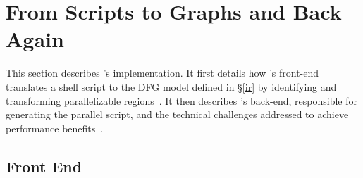 \documentclass[letterpaper,twocolumn,10pt]{article}
\newcommand{\kk}[1]{[{\color{magenta}kk: #1}]}
\newcommand{\tr}[1]{} %
\begin{document}

\tr{If there is time I can work out a formal definition and a proof
  sketch why this transformation preserves the output of the dataflow
  graph.}




\section{From Scripts to Graphs and Back Again}
\label{impl}

This section describes \sys's implementation.
It first details how \sys's front-end translates a shell script to the DFG model defined in \S\ref{ir} by identifying and transforming parallelizable regions~.
It then describes \sys's back-end, responsible for generating the parallel script, and the technical challenges addressed to achieve performance benefits~.

\subsection{Front End}
\label{front-end}
\end{document}
